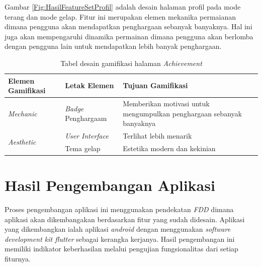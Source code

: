 Gambar \ref*{Fig:HasilFeatureSetProfil} adalah desain halaman profil pada mode terang dan mode gelap. Fitur ini merupakan elemen mekanika permaianan dimana pengguna akan mendapatkan penghargaan sebanyak banyaknya.
Hal ini juga akan mempengaruhi dinamika permainan dimana pengguna akan berlomba dengan pengguna lain untuk mendapatkan lebih banyak penghargaan. 
\begin{table}[H]
	\caption{Tabel desain gamifikasi halaman \textit{Achievement}}
	\label{TabelGameAchivement}
	\begin{tabular}{|m{3.6cm}|m{}|m{}|}
		\hline
		Elemen Gamifikasi& Letak Elemen & Tujuan Gamifikasi\\
		\hline
		\textit{Mechanic}&\textit{Badge} Penghargaam &Memberikan motivasi untuk mengumpulkan penghargaan sebanyak banyaknya \\
		\hline
		\multirow{2}{1cm}{\textit{Aesthetic}}&\textit{User Interface}&Terlihat lebih menarik\\
		\cline{2-3}
		& Tema gelap & Estetika modern dan kekinian \\
		\hline
	\end{tabular}
\end{table}


\section{Hasil Pengembangan Aplikasi}
Proses pengembangan aplikasi ini menggunakan pendekatan \textit{FDD} dimana aplikasi akan dikembangakan berdasarkan fitur yang sudah didesain.
Aplikasi yang dikembangkan ialah aplikasi \textit{android} dengan menggunakan \textit{software development kit flutter} sebagai kerangka kerjanya.
Hasil pengembangan ini memiliki indikator keberhasilan melalui pengujian fungsionalitas dari setiap fiturnya.
